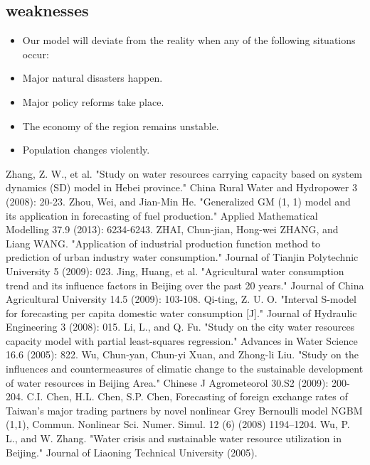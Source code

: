 \documentclass{mcmthesis}
\begin{document}
\subsection{weaknesses}
\begin{itemize}
\item Our model will deviate from the reality when any of the following situations occur:
\item Major natural disasters happen.
\item Major policy reforms take place.
\item The economy of the region remains unstable.
\item Population changes violently.
\end{itemize}
\begin{thebibliography}{99}
 Zhang, Z. W., et al. "Study on water resources carrying capacity based on system dynamics (SD) model in Hebei province." China Rural Water and Hydropower 3 (2008): 20-23.
Zhou, Wei, and Jian-Min He. "Generalized GM (1, 1) model and its application in forecasting of fuel production." Applied Mathematical Modelling 37.9 (2013): 6234-6243.
 ZHAI, Chun-jian, Hong-wei ZHANG, and Liang WANG. "Application of industrial production function method to prediction of urban industry water consumption." Journal of Tianjin Polytechnic University 5 (2009): 023.
Jing, Huang, et al. "Agricultural water consumption trend and its influence factors in Beijing over the past 20 years." Journal of China Agricultural University 14.5 (2009): 103-108.
 Qi-ting, Z. U. O. "Interval S-model for forecasting per capita domestic water consumption [J]." Journal of Hydraulic Engineering 3 (2008): 015.
 Li, L., and Q. Fu. "Study on the city water resources capacity model with partial least-squares regression." Advances in Water Science 16.6 (2005): 822.
Wu, Chun-yan, Chun-yi Xuan, and Zhong-li Liu. "Study on the influences and countermeasures of climatic change to the sustainable development of water resources in Beijing Area." Chinese J Agrometeorol 30.S2 (2009): 200-204.
 C.I. Chen, H.L. Chen, S.P. Chen, Forecasting of foreign exchange rates of Taiwan’s major trading partners by novel nonlinear Grey Bernoulli model NGBM
(1,1), Commun. Nonlinear Sci. Numer. Simul. 12 (6) (2008) 1194–1204.
 Wu, P. L., and W. Zhang. "Water crisis and sustainable water resource utilization in Beijing." Journal of Liaoning Technical University (2005). 

\end{thebibliography}
\end{document}
